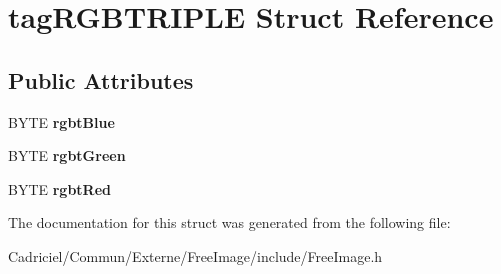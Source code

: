 \hypertarget{structtag_r_g_b_t_r_i_p_l_e}{\section{tag\-R\-G\-B\-T\-R\-I\-P\-L\-E Struct Reference}
\label{structtag_r_g_b_t_r_i_p_l_e}
}
\subsection*{Public Attributes}
\begin{DoxyCompactItemize}
\item 
\hypertarget{structtag_r_g_b_t_r_i_p_l_e_adbebf9e7802cdfffbdae31c08a71dab7}{B\-Y\-T\-E {\bfseries rgbt\-Blue}}\label{structtag_r_g_b_t_r_i_p_l_e_adbebf9e7802cdfffbdae31c08a71dab7}

\item 
\hypertarget{structtag_r_g_b_t_r_i_p_l_e_a2e3e106422819352693de65189cc341f}{B\-Y\-T\-E {\bfseries rgbt\-Green}}\label{structtag_r_g_b_t_r_i_p_l_e_a2e3e106422819352693de65189cc341f}

\item 
\hypertarget{structtag_r_g_b_t_r_i_p_l_e_ae61b0771fd3e1e267a3495dcfba5e21c}{B\-Y\-T\-E {\bfseries rgbt\-Red}}\label{structtag_r_g_b_t_r_i_p_l_e_ae61b0771fd3e1e267a3495dcfba5e21c}

\end{DoxyCompactItemize}


The documentation for this struct was generated from the following file\-:\begin{DoxyCompactItemize}
\item 
Cadriciel/\-Commun/\-Externe/\-Free\-Image/include/Free\-Image.\-h\end{DoxyCompactItemize}
